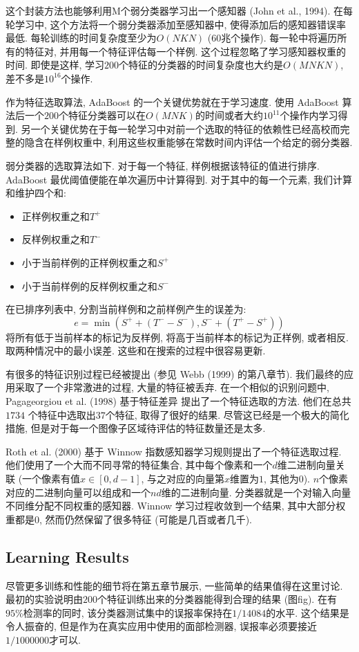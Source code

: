 \documentclass[utf8]{ctexart}
\begin{document}
这个封装方法也能够利用M个弱分类器学习出一个感知器 (John et al., 1994). 在每轮学习中, 这个方法将一个弱分类器添加至感知器中, 使得添加后的感知器错误率最低. 每轮训练的时间复杂度至少为$O(NKN)$ ($60$兆个操作). 每一轮中将遍历所有的特征对, 并用每一个特征评估每一个样例.
这个过程忽略了学习感知器权重的时间. 即使是这样, 学习$200$个特征的分类器的时间复杂度也大约是$O(MNKN)$, 差不多是$10^{16}$个操作.

作为特征选取算法, AdaBoost 的一个关键优势就在于学习速度. 使用 AdaBoost 算法后一个$200$个特征分类器可以在$O(MNK)$的时间或者大约$10^{11}$个操作内学习得到. 另一个关键优势在于每一轮学习中对前一个选取的特征的依赖性已经高校而完整的隐含在样例权重中, 利用这些权重能够在常数时间内评估一个给定的弱分类器.

弱分类器的选取算法如下. 对于每一个特征, 样例根据该特征的值进行排序. AdaBoost 最优阈值便能在单次遍历中计算得到. 对于其中的每一个元素, 我们计算和维护四个和:
\begin{itemize}
\item 正样例权重之和$T^+$
\item 反样例权重之和$T^-$
\item 小于当前样例的正样例权重之和$S^+$
\item 小于当前样例的反样例权重之和$S^-$
\end{itemize}
在已排序列表中, 分割当前样例和之前样例产生的误差为:
\[
e=\min(S^++(T^--S^-),S^-+(T^+-S^+))
\]
将所有低于当前样本的标记为反样例, 将高于当前样本的标记为正样例, 或者相反. 取两种情况中的最小误差. 这些和在搜索的过程中很容易更新.

有很多的特征识别过程已经被提出 (参见 Webb (1999) 的第八章节). 我们最终的应用采取了一个非常激进的过程, 大量的特征被丢弃. 在一个相似的识别问题中,  Pagageorgiou et al. (1998) 基于特征差异
提出了一个特征选取的方法. 他们在总共 $1734$ 个特征中选取出$37$个特征, 取得了很好的结果. 尽管这已经是一个极大的简化措施, 但是对于每一个图像子区域待评估的特征数量还是太多.

Roth et al. (2000) 基于 Winnow 指数感知器学习规则提出了一个特征选取过程. 他们使用了一个大而不同寻常的特征集合, 其中每个像素和一个$d$维二进制向量关联 (一个像素有值$x\in[0, d-1]$, 与之对应的向量第$x$维置为$1$, 其他为$0$). $n$个像素对应的二进制向量可以组成和一个$nd$维的二进制向量. 分类器就是一个对输入向量不同维分配不同权重的感知器. Winnow 学习过程收敛到一个结果, 其中大部分权重都是$0$, 然而仍然保留了很多特征 (可能是几百或者几千).

\subsection{Learning Results}
尽管更多训练和性能的细节将在第五章节展示, 一些简单的结果值得在这里讨论. 最初的实验说明由$200$个特征训练出来的分类器能得到合理的结果 (图fig). 在有$95\%$检测率的同时, 该分类器测试集中的误报率保持在$1/14084$的水平.
这个结果是令人振奋的, 但是作为在真实应用中使用的面部检测器, 误报率必须要接近$1/1000000$才可以.
\end{document}
